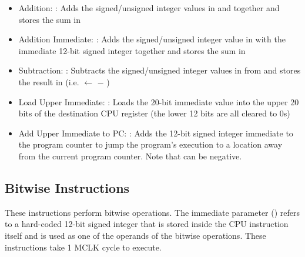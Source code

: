 \documentclass[11pt,pdftex,portrait,letterpaper]{article}
\begin{document}
\begin{itemize}
	\item Addition: : Adds the signed/unsigned integer values in  and  together and stores the sum in 
	\item Addition Immediate: : Adds the signed/unsigned integer value in  with the immediate 12-bit signed integer  together and stores the sum in 
	\item Subtraction: : Subtracts the signed/unsigned integer values in  from  and stores the result in  (i.e.  $\leftarrow$  $-$ )
	\item Load Upper Immediate: : Loads the 20-bit immediate value  into the upper 20 bits of the destination CPU register  (the lower 12 bits are all cleared to 0s)
	\item Add Upper Immediate to PC: : Adds the 12-bit signed integer immediate  to the program counter to jump the program's execution to a location  away from the current program counter. Note that  can be negative.
\end{itemize}

\subsection{Bitwise Instructions}

These instructions perform bitwise operations. The immediate parameter () refers to a hard-coded 12-bit signed integer that is stored inside the CPU instruction itself and is used as one of the operands of the bitwise operations. These instructions take 1 MCLK cycle to execute.
\end{document}
